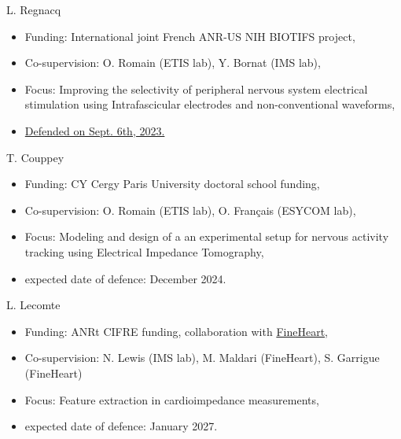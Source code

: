 
\begin{cvskills}
  \cvskill
    {L. Regnacq} %
    {\begin{itemize}
    	\item Funding: International joint French ANR-US NIH BIOTIFS project,
    	\item Co-supervision: O. Romain (ETIS lab), Y. Bornat (IMS lab),
    	\item Focus: Improving the selectivity of peripheral nervous system electrical stimulation using Intrafascicular electrodes and non-conventional waveforms,
    	\item \href{https://theses.fr/2023CYUN1201}{Defended on Sept. 6th, 2023.}
    \end{itemize}
    } %
  \cvskill
    {T. Couppey} %
    {\begin{itemize}
    	\item Funding: CY Cergy Paris University doctoral school funding,
    	\item Co-supervision: O. Romain (ETIS lab), O. Français (ESYCOM lab),
    	\item Focus: Modeling and design of a an experimental setup for nervous activity tracking using Electrical Impedance Tomography,
    	\item expected date of defence: December 2024.
    \end{itemize}
    } %
  \cvskill
    {L. Lecomte} %
    {\begin{itemize}
    	\item Funding: ANRt CIFRE funding, collaboration with \href{http://fineheart.fr}{FineHeart},
    	\item Co-supervision: N. Lewis (IMS lab), M. Maldari (FineHeart), S. Garrigue (FineHeart)
    	\item Focus: Feature extraction in cardioimpedance measurements,
    	\item expected date of defence: January 2027.
    \end{itemize}
    } %
\end{cvskills}


